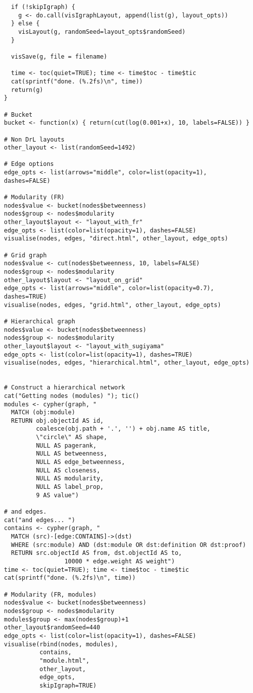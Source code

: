 \begin{verbatim}
  if (!skipIgraph) {
    g <- do.call(visIgraphLayout, append(list(g), layout_opts))
  } else {
    visLayout(g, randomSeed=layout_opts$randomSeed)
  }

  visSave(g, file = filename)

  time <- toc(quiet=TRUE); time <- time$toc - time$tic
  cat(sprintf("done. (%.2fs)\n", time))
  return(g)
}

# Bucket
bucket <- function(x) { return(cut(log(0.001+x), 10, labels=FALSE)) }

# Non DrL layouts
other_layout <- list(randomSeed=1492)

# Edge options
edge_opts <- list(arrows="middle", color=list(opacity=1), dashes=FALSE)

# Modularity (FR)
nodes$value <- bucket(nodes$betweenness)
nodes$group <- nodes$modularity
other_layout$layout <- "layout_with_fr"
edge_opts <- list(color=list(opacity=1), dashes=FALSE)
visualise(nodes, edges, "direct.html", other_layout, edge_opts)

# Grid graph
nodes$value <- cut(nodes$betweenness, 10, labels=FALSE)
nodes$group <- nodes$modularity
other_layout$layout <- "layout_on_grid"
edge_opts <- list(arrows="middle", color=list(opacity=0.7), dashes=TRUE)
visualise(nodes, edges, "grid.html", other_layout, edge_opts)

# Hierarchical graph
nodes$value <- bucket(nodes$betweenness)
nodes$group <- nodes$modularity
other_layout$layout <- "layout_with_sugiyama"
edge_opts <- list(color=list(opacity=1), dashes=TRUE)
visualise(nodes, edges, "hierarchical.html", other_layout, edge_opts)


# Construct a hierarchical network
cat("Getting nodes (modules) "); tic()
modules <- cypher(graph, "
  MATCH (obj:module)
  RETURN obj.objectId AS id,
         coalesce(obj.path + '.', '') + obj.name AS title,
         \"circle\" AS shape,
         NULL AS pagerank,
         NULL AS betweenness,
         NULL AS edge_betweenness,
         NULL AS closeness,
         NULL AS modularity,
         NULL AS label_prop,
         9 AS value")

# and edges.
cat("and edges... ")
contains <- cypher(graph, "
  MATCH (src)-[edge:CONTAINS]->(dst)
  WHERE (src:module) AND (dst:module OR dst:definition OR dst:proof)
  RETURN src.objectId AS from, dst.objectId AS to,
				 10000 * edge.weight AS weight")
time <- toc(quiet=TRUE); time <- time$toc - time$tic
cat(sprintf("done. (%.2fs)\n", time))

# Modularity (FR, modules)
nodes$value <- bucket(nodes$betweenness)
nodes$group <- nodes$modularity
modules$group <- max(nodes$group)+1
other_layout$randomSeed=440
edge_opts <- list(color=list(opacity=1), dashes=FALSE)
visualise(rbind(nodes, modules),
          contains,
          "module.html",
          other_layout,
          edge_opts,
          skipIgraph=TRUE)

\end{verbatim}
